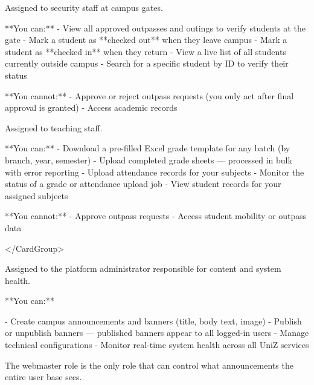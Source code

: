 \begin{tcolorbox}[colback=gray!5,colframe=primary,title=Documentation Note]
  
\begin{tcolorbox}[colback=gray!5,colframe=primary,title=Documentation Note]

    Assigned to security staff at campus gates.

    **You can:**
    - View all approved outpasses and outings to verify students at the gate
    - Mark a student as **checked out** when they leave campus
    - Mark a student as **checked in** when they return
    - View a live list of all students currently outside campus
    - Search for a specific student by ID to verify their status

    **You cannot:**
    - Approve or reject outpass requests (you only act after final approval is granted)
    - Access academic records

  
\end{tcolorbox}


  
\begin{tcolorbox}[colback=gray!5,colframe=primary,title=Documentation Note]

    Assigned to teaching staff.

    **You can:**
    - Download a pre-filled Excel grade template for any batch (by branch, year, semester)
    - Upload completed grade sheets — processed in bulk with error reporting
    - Upload attendance records for your subjects
    - Monitor the status of a grade or attendance upload job
    - View student records for your assigned subjects

    **You cannot:**
    - Approve outpass requests
    - Access student mobility or outpass data

  
\end{tcolorbox}

</CardGroup>


\begin{tcolorbox}[colback=gray!5,colframe=primary,title=Documentation Note]

  Assigned to the platform administrator responsible for content and system health.

**You can:**

- Create campus announcements and banners (title, body text, image)
- Publish or unpublish banners — published banners appear to all logged-in users
- Manage technical configurations
- Monitor real-time system health across all UniZ services

The webmaster role is the only role that can control what announcements the entire user base sees.



\end{tcolorbox}
\end{tcolorbox}
